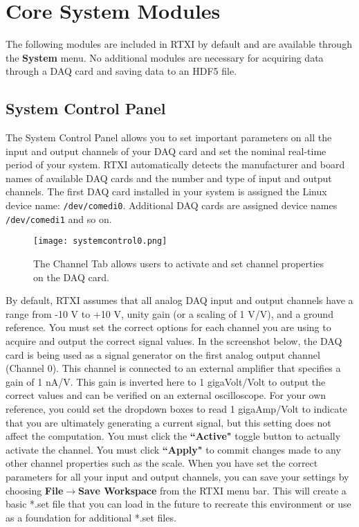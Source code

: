 \section{Core System Modules}
The following modules are included in RTXI by default and are available through the \textbf{System} menu. No additional modules are necessary for acquiring data through a DAQ card and saving data to an HDF5 file.

\subsection{System Control Panel}
\label{system control panel}

The System Control Panel allows you to set important parameters on all the input and output channels of your DAQ card and set the nominal real-time period of your system. RTXI automatically detects the manufacturer and board names of available DAQ cards and the number and type of input and output channels. The first DAQ card installed in your system is assigned the Linux device name: \texttt{/dev/comedi0}. Additional DAQ cards are assigned device names \texttt{/dev/comedi1} and so on.

\begin{figure}[h]
\begin{center}
\texttt{[image: systemcontrol0.png]} 
\caption[System Control Panel: Channel Tab]{The Channel Tab allows users to activate and set channel properties on the DAQ card.} 
\end{center}
\label{fig:systemcontrolpanel0}
\end{figure}

By default, RTXI assumes that all analog DAQ input and output channels have a range from -10 V to +10 V, unity gain (or a scaling of 1 V/V), and a ground reference. You must set the correct options for each channel you are using to acquire and output the correct signal values. In the screenshot below, the DAQ card is being used as a signal generator on the first analog output channel (Channel 0). This channel is connected to an external amplifier that specifies a gain of 1 nA/V. This gain is inverted here to 1 gigaVolt/Volt to output the correct values and can be verified on an external oscilloscope. For your own reference, you could set the dropdown boxes to read 1 gigaAmp/Volt to indicate that you are ultimately generating a current signal, but this setting does not affect the computation. \attention You must click the \textbf{``Active"} toggle button to actually activate the channel. You must click \textbf{``Apply"} to commit changes made to any other channel properties such as the scale. When you have set the correct parameters for all your input and output channels, you can save your settings by choosing \textbf{File}$\rightarrow$\textbf{Save Workspace} from the RTXI menu bar. This will create a basic *.set file that you can load in the future to recreate this environment or use as a foundation for additional *.set files.

